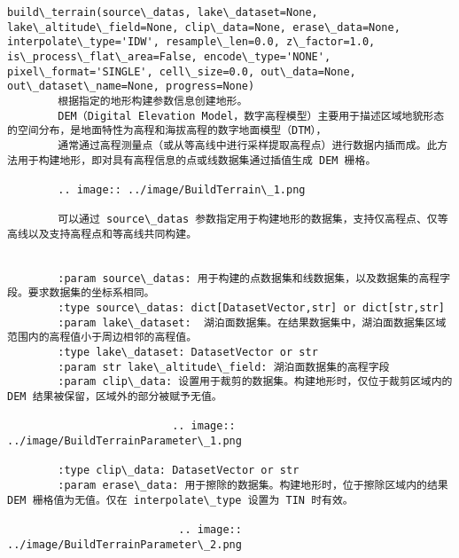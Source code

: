 \documentclass[11pt]{article}
\begin{document}
\begin{Verbatim}[commandchars=\\\{\}]
    build\_terrain(source\_datas, lake\_dataset=None, lake\_altitude\_field=None, clip\_data=None, erase\_data=None, interpolate\_type='IDW', resample\_len=0.0, z\_factor=1.0, is\_process\_flat\_area=False, encode\_type='NONE', pixel\_format='SINGLE', cell\_size=0.0, out\_data=None, out\_dataset\_name=None, progress=None)
        根据指定的地形构建参数信息创建地形。
        DEM（Digital Elevation Model，数字高程模型）主要用于描述区域地貌形态的空间分布，是地面特性为高程和海拔高程的数字地面模型（DTM），
        通常通过高程测量点（或从等高线中进行采样提取高程点）进行数据内插而成。此方法用于构建地形，即对具有高程信息的点或线数据集通过插值生成 DEM 栅格。
        
        .. image:: ../image/BuildTerrain\_1.png
        
        可以通过 source\_datas 参数指定用于构建地形的数据集，支持仅高程点、仅等高线以及支持高程点和等高线共同构建。
        
        
        :param source\_datas: 用于构建的点数据集和线数据集，以及数据集的高程字段。要求数据集的坐标系相同。
        :type source\_datas: dict[DatasetVector,str] or dict[str,str]
        :param lake\_dataset:  湖泊面数据集。在结果数据集中，湖泊面数据集区域范围内的高程值小于周边相邻的高程值。
        :type lake\_dataset: DatasetVector or str
        :param str lake\_altitude\_field: 湖泊面数据集的高程字段
        :param clip\_data: 设置用于裁剪的数据集。构建地形时，仅位于裁剪区域内的 DEM 结果被保留，区域外的部分被赋予无值。
        
                          .. image:: ../image/BuildTerrainParameter\_1.png
        
        :type clip\_data: DatasetVector or str
        :param erase\_data: 用于擦除的数据集。构建地形时，位于擦除区域内的结果 DEM 栅格值为无值。仅在 interpolate\_type 设置为 TIN 时有效。
        
                           .. image:: ../image/BuildTerrainParameter\_2.png
        

\end{Verbatim}
\end{document}
